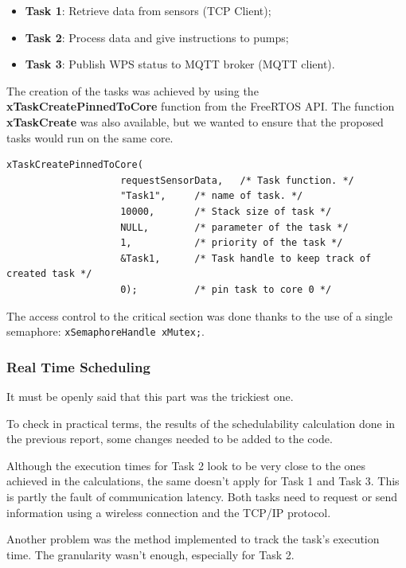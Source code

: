 \documentclass[11pt]{article}
\begin{document}
\begin{itemize}
	\item  \textbf{Task 1}: Retrieve data from sensors (TCP Client);
	\item  \textbf{Task 2}: Process data and give instructions to pumps;
	\item  \textbf{Task 3}: Publish WPS status to MQTT broker (MQTT client).
\end{itemize}

\noindent
The creation of the tasks was achieved by using the \textbf{xTaskCreatePinnedToCore} \cite{c1} function from the FreeRTOS API. The function \textbf{xTaskCreate} was also available, but we wanted to ensure that the proposed tasks would run on the same core.

\begin{verbatim}
xTaskCreatePinnedToCore(
                    requestSensorData,   /* Task function. */
                    "Task1",     /* name of task. */
                    10000,       /* Stack size of task */
                    NULL,        /* parameter of the task */
                    1,           /* priority of the task */
                    &Task1,      /* Task handle to keep track of created task */
                    0);          /* pin task to core 0 */  
\end{verbatim}

The access control to the critical section was done thanks to the use of a single semaphore: \texttt{xSemaphoreHandle xMutex;}.

\subsubsection{Real Time Scheduling}

It must be openly said that this part was the trickiest one.

To check in practical terms, the results of the schedulability calculation done in the previous report, some changes needed to be added to the code.

Although the execution times for Task 2 look to be very close to the ones achieved in the calculations, the same doesn't apply for Task 1 and Task 3. This is partly the fault of communication latency. Both tasks need to request or send information using a wireless connection and the TCP/IP protocol.

Another problem was the method implemented to track the task's execution time. The granularity wasn't enough, especially for Task 2.
\end{document}
